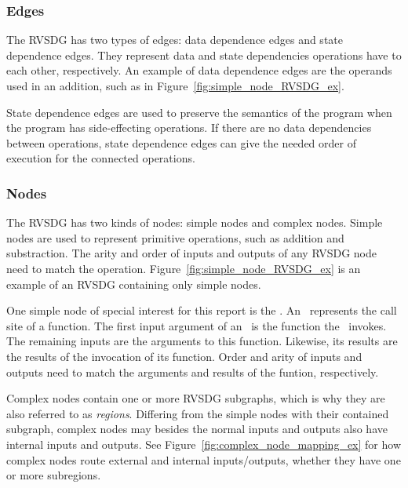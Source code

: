 \subsubsection{Edges}

The RVSDG has two types of edges: data dependence edges and state dependence
edges. They represent data and state dependencies operations have to each other,
respectively. An example of data dependence edges are the operands used in an
addition, such as in Figure~\ref{fig:simple_node_RVSDG_ex}.

State dependence edges are used to preserve the semantics of the program when
the program has side-effecting operations. If there are no data dependencies
between operations, state dependence edges can give the needed order of
execution for the connected operations.

\subsubsection{Nodes}

The RVSDG has two kinds of nodes: simple nodes and complex nodes. Simple nodes
are used to represent primitive operations, such as addition and substraction.
The arity and order of inputs and outputs of any RVSDG node need to match the
operation. Figure~\ref{fig:simple_node_RVSDG_ex} is an example of an RVSDG
containing only simple nodes.

One simple node of special interest for this report is the \applyNode . An
\applyNode~represents the call site of a function. The first input argument of
an \applyNode~is the function the \applyNode~invokes. The remaining inputs are
the arguments to this function. Likewise, its results are the results of the
invocation of its function. Order and arity of inputs and outputs need to match
the arguments and results of the funtion, respectively.

Complex nodes contain one or more RVSDG subgraphs, which is why they are also
referred to as \textit{regions}. Differing from the simple nodes with their
contained subgraph, complex nodes may besides the normal inputs and outputs also
have internal inputs and outputs. See Figure~\ref{fig:complex_node_mapping_ex}
for how complex nodes route external and internal inputs/outputs, whether they
have one or more subregions.

